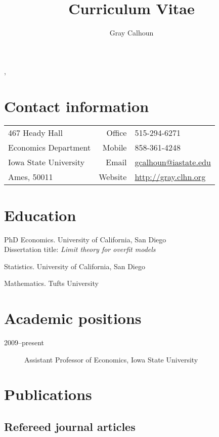 \documentclass[12pt]{article}%
\author{Gray Calhoun}
\title{Curriculum Vitae}
\makeatletter
\newcommand{\allcaps}[1]{\textls{\MakeUppercase{#1}}}
\def\maketitle{%
\begin{center}%
\par{\textls{\MakeUppercase{\textbf{\@author}}}}%
\vspace{\itemsep}%
\par{\@title, \@date}%
\end{center}%
}
\makeatother
\begin{document}
\maketitle

\section*{Contact information}
\begin{tabular}{@{}lrl@{}}
 467 Heady Hall            & Office  & 515-294-6271              \\
 Economics Department      & Mobile  & 858-361-4248              \\
 Iowa State University     & Email   & \url{gcalhoun@iastate.edu}\\
 Ames, \allcaps{IA} 50011  & Website & \url{http://gray.clhn.org}
\end{tabular}

\section*{Education}

\begin{description}[noitemsep]
\item[2009] PhD Economics. University of California, San Diego \\
Dissertation title: \textit{Limit theory for overfit models}
\item[2006] \allcaps{MS} Statistics. University of California, San Diego
\item[2001] \allcaps{BA} Mathematics. Tufts University
\end{description}

\section*{Academic positions}

\begin{description}
\item[2009--present] Assistant Professor of Economics, Iowa State University
\end{description}

\section*{Publications}
\subsection*{Refereed journal articles}
\end{document}

